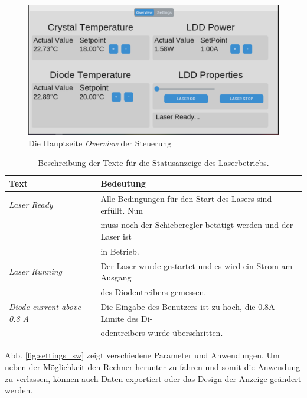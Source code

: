 \begin{figure}[H]
    \centering
    \includegraphics[scale=0.3, trim={1mm 1mm 1mm 1mm}, clip]{98_images/window_overview_large_04.PNG}
    \caption{Die Hauptseite \textit{Overview} der Steuerung}
    \label{fig:overview_sw}
\end{figure}

\begin{table}[H]
    \centering
    \begin{tabular}{l|l}
        \textbf{Text}&                          \textbf{Bedeutung}\\
        \hline
         \textit{Laser Ready}&                  Alle Bedingungen für den Start des Lasers sind erfüllt. Nun\\
         &                                      muss noch der Schieberegler betätigt werden und der Laser ist\\
         &                                      in Betrieb.\\
         \textit{Laser Running}&                Der Laser wurde gestartet und es wird ein Strom am Ausgang\\
         &                                      des Diodentreibers gemessen.\\
         \textit{Diode current above 0.8 A}&    Die Eingabe des Benutzers ist zu hoch, die 0.8A Limite des Di-\\
         &                                      odentreibers wurde überschritten.                                
    \end{tabular}
    \caption{Beschreibung der Texte für die Statusanzeige des Laserbetriebs.}
    \label{tab:my_label}
\end{table}

Abb. \ref{fig:settings_sw} zeigt verschiedene Parameter und Anwendungen. Um neben der Möglichkeit den Rechner herunter zu fahren und somit die Anwendung zu verlassen, können auch Daten exportiert oder das Design der Anzeige geändert werden.


